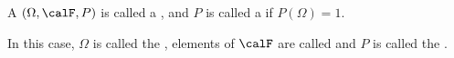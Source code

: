 \begin{definition} \label{definition:probability_measure_space_for_a_measure_on_a_measurable_space}
    A  $(\Omega, \calF, P)$ is called a , and $P$ is called a  if $P(\Omega) = 1$. 

    In this case, $\Omega$ is called the , elements of $\calF$ are called  and $P$ is called the .
\end{definition}
